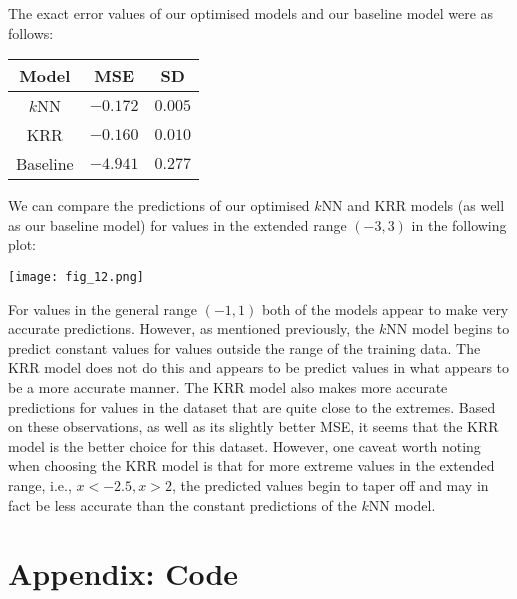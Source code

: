 \documentclass[12pt]{article}
\begin{document}
The exact error values of our optimised models and our baseline model were as follows:

\begin{center}
    \begin{tabular}{|c|c|c|}
        \hline
        Model & MSE & SD \\
        \hline
        $k$NN & $-0.172$ & $0.005$ \\
        KRR & $-0.160$ & $0.010$ \\
        Baseline & $-4.941$ & $0.277$ \\
        \hline
    \end{tabular}
\end{center}

We can compare the predictions of our optimised $k$NN and KRR models (as well as our baseline model) for values in the extended range $(-3, 3)$ in the following plot:

\begin{center}
    \texttt{[image: fig\_12.png]}
\end{center}

For values in the general range $(-1, 1)$ both of the models appear to make very accurate predictions. However, as mentioned previously, the $k$NN model begins to predict constant values for values outside the range of the training data. The KRR model does not do this and appears to be predict values in what appears to be a more accurate manner. The KRR model also makes more accurate predictions for values in the dataset that are quite close to the extremes. Based on these observations, as well as its slightly better MSE, it seems that the KRR model is the better choice for this dataset. However, one caveat worth noting when choosing the KRR model is that for more extreme values in the extended range, i.e., $x < -2.5, x > 2$, the  predicted values begin to taper off and may in fact be less accurate than the constant predictions of the $k$NN model.

\section*{Appendix: Code}
\end{document}
